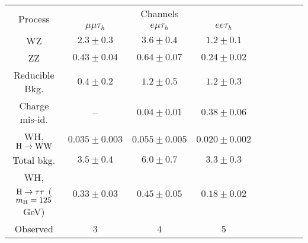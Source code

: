 \begin{center}
\begin{tabular}{c c c c c c c c c}
\hline
\multirow{2}{*}{Process} & \multicolumn{3}{c}{Channels} \\
& $\mu\mu\tau_h$ & $e\mu\tau_h$ & $ee\tau_h$ \\
\hline
WZ & $ 2.3 \pm 0.3 $ & $ 3.6 \pm 0.4 $ & $ 1.2 \pm 0.1 $ \\
ZZ & $ 0.43 \pm 0.04 $ & $ 0.64 \pm 0.07 $ & $ 0.24 \pm 0.02 $ \\
Reducible Bkg. & $ 0.4 \pm 0.2 $ & $ 1.2 \pm 0.5 $ & $ 1.2 \pm 0.3 $ \\
Charge mis-id. & -- & $ 0.04 \pm 0.01 $ & $ 0.38 \pm 0.06 $ \\
WH, $\rm{H}\To\W\W$ & $ 0.035 \pm 0.003 $ & $ 0.055 \pm 0.005 $ & $ 0.020 \pm 0.002 $ \\
\hline
Total bkg. & $ 3.5 \pm 0.4 $ & $ 6.0 \pm 0.7 $ & $ 3.3 \pm 0.3 $ \\
\hline
WH, $\rm{H}\To\tau\tau$ ($m_\rm{H}=125$ GeV) & $ 0.33 \pm 0.03 $ & $ 0.45 \pm 0.05 $ & $ 0.18 \pm 0.02 $ \\
\hline
Observed & 3 & 4 & 5 \\
\hline
\end{tabular}
\end{center}
